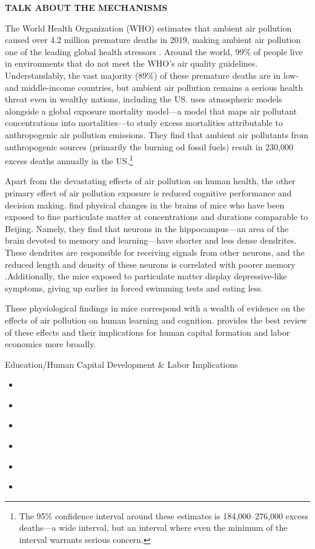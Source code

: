 \textbf{TALK ABOUT THE MECHANISMS}

The World Health Organization (WHO) estimates that ambient air pollution caused over 4.2 million premature deaths in 2019, making ambient air pollution one of the leading global health stressors \citep{who_factsheet}. Around the world, 99\% of people live in environments that do not meet the WHO's air quality guidelines. Understandably, the vast majority (89\%) of these premature deaths are in low- and middle-income countries, but ambient air pollution remains a serious health threat even in wealthy nations, including the US. \cite{lelieveld2019effects} uses atmospheric models alongside a global exposure mortality model---a model that maps air pollutant concentrations into mortalities---to study excess mortalities attributable to anthropogenic air pollution emissions. They find that ambient air pollutants from anthropogenic sources (primarily the burning od fossil fuels) result in 230,000 excess deaths annually in the US.\footnote{
    The 95\% confidence interval around these estimates is 184,000--276,000 excess deaths---a wide interval, but an interval where even the minimum of the interval warrants serious concern.
} 

Apart from the devastating effects of air pollution on human health, the other primary effect of air pollution exposure is reduced cognitive performance and decision making. \cite{fonken2011air} find physical changes in the brains of mice who have been exposed to fine particulate matter at concentrations and durations comparable to Beijing. Namely, they find that neurons in the hippocampus---an area of the brain devoted to memory and learning---have shorter and less dense dendrites. These dendrites are responsible for receiving signals from other neurons, and the reduced length and density of these neurons is correlated with poorer memory \citep{weir2012smog}.Additionally, the mice exposed to particulate matter display depressive-like symptoms, giving up earlier in forced swimming tests and eating less. 

These physiological findings in mice correspond with a wealth of evidence on the effects of air pollution on human learning and cognition. \cite{aguilar2022air} provides the best review of these effects and their implications for human capital formation and labor economics more broadly. 

\noindent Education/Human Capital Development \& Labor Implications
\begin{itemize}
    \item \cite{zhang2018impact}
    \item \cite{currie2014we}
    \item \cite{aguilar2022air}
    \item \cite{currie2009does}
    \item \cite{ebenstein2016long}
    \item \cite{chang2016particulate}
\end{itemize}





